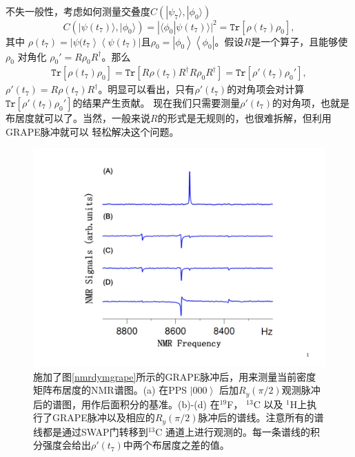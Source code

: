 不失一般性，考虑如何测量交叠度$C(| \psi_{7} \rangle,| \phi_{0} \rangle)$
 \begin{equation}
C(| \psi(t_{7}) \rangle,| \phi_{0} \rangle)=| \langle\phi_0|\psi(t_7)\rangle |^2=\texttt{Tr}[\rho(t_7) \rho_0],
\end{equation}
其中 $\rho(t_7)=\left\vert \psi(t_{7} \right\rangle\left\langle \psi(t_{7}) \right\vert$且$\rho_0=\left\vert \phi_{0} \right\rangle\left\langle \phi_{0} \right\vert$。假设$R$是一个算子，且能够使$\rho_0$
对角化 $\rho_0'=R \rho_0R^{\dagger}$。那么
\begin{eqnarray}
\texttt{Tr}[\rho(t_7) \rho_0]=\texttt{Tr}[R\rho(t_7) R^{\dagger}R \rho_0R^{\dagger}]=\texttt{Tr}[\rho'(t_7) \rho_0'],
\end{eqnarray}
$\rho'(t_7)=R \rho(t_7)R^{\dagger}$。明显可以看出，只有$\rho'(t_7)$的对角项会对计算$\texttt{Tr}[\rho'(t_7) \rho_0']$的结果产生贡献。
现在我们只需要测量$\rho'(t_7)$的对角项，也就是布居度就可以了。当然，一般来说$R$的形式是无规则的，也很难拆解，但利用GRAPE脉冲就可以
轻松解决这个问题。

 \begin{figure}[htbp]
            \begin{center}
              \includegraphics[width= 0.8\columnwidth]{figures/nmrdymspec.pdf}
              \caption{施加了图\ref{nmrdymgrape}所示的GRAPE脉冲后，用来测量当前密度矩阵布居度的NMR谱图。(a) 在PPS $\left\vert 000 \right\rangle$
              后加$R_y(\pi/2)$观测脉冲后的谱图，用作后面积分的基准。(b)-(d) 在$^{19}$F， $^{13}$C 以及 $^1$H上执行了GRAPE脉冲以及相应的$R_y(\pi/2)$脉冲后的谱线。注意所有的谱线都是通过SWAP门转移到$^{13}$C
              通道上进行观测的。每一条谱线的积分强度会给出$\rho'(t_7)$中两个布居度之差的值。}\label{nmrdymspec}
            \end{center}
 \end{figure}

